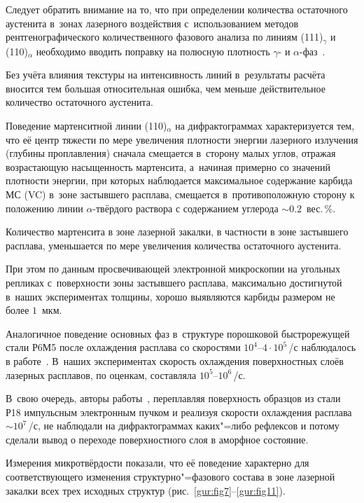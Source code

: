 Следует обратить внимание на то, что при определении количества остаточного аустенита в~зонах лазерного воздействия с~использованием методов рентгенографического количественного фазового анализа по линиям (111)$_\gamma$ и (110)$_\alpha$ необходимо вводить поправку на полюсную плотность $\gamma $- и $\alpha $-фаз~\cite{gureev:bib8}. 

Без учёта влияния текстуры на интенсивность линий в~результаты расчёта вносится тем большая  относительная ошибка, чем меньше действительное количество остаточного аустенита.



Поведение мартенситной линии (110)$_{\alpha }$ на дифрактограммах характеризуется тем, что её центр тяжести по мере увеличения плотности энергии лазерного излучения (глубины проплавления) сначала смещается в~сторону малых углов, отражая возрастающую насыщенность мартенсита, а~начиная примерно со значений плотности энергии, при которых наблюдается максимальное содержание карбида МС (VC) в~зоне застывшего расплава, смещается в~противоположную сторону к положению линии $\alpha $-твёрдого раствора с содержанием углерода $\sim  0.2$~вес.\,\%. 

Количество мартенсита в зоне лазерной закалки, в частности в зоне застывшего расплава, уменьшается по мере увеличения количества остаточного аустенита. 

При этом по данным просвечивающей электронной микроскопии на угольных репликах с~поверхности зоны застывшего расплава, максимально достигнутой в~наших экспериментах толщины, хорошо выявляются карбиды размером не более $1$~мкм.



Аналогичное поведение основных фаз в~структуре порошковой быстрорежущей стали Р6М5 после охлаждения расплава со скоростями $10^4$--$4\cdot 10^5$\,\textcelsius/с наблюдалось в работе~\cite{gureev:bib9}. В~наших экспериментах скорость охлаждения поверхностных слоёв лазерных расплавов, по оценкам, составляла $10^5$--$10^6$\,\textcelsius/с. 

В~свою очередь, авторы работы~\cite{gureev:bib10}, переплавляя поверхность образцов из стали Р18 импульсным электронным пучком и реализуя скорости охлаждения расплава $\sim  10^7$\,\textcelsius/с, не наблюдали на дифрактограммах каких"=либо рефлексов и потому сделали вывод о переходе поверхностного слоя в аморфное состояние.



Измерения микротвёрдости показали, что её поведение характерно для соответствующего изменения структурно"=фазового состава в зоне лазерной закалки всех трех исходных структур (рис.~\ref{gur:fig7}--\ref{gur:fig11}). 

